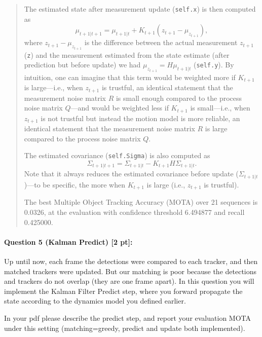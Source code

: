 \documentclass[11pt]{article}
\begin{document}
\begin{quote}
The estimated state after measurement update (\texttt{self.x}) is then computed as 
\[ \mu_{t+1 | t+1} = \mu_{t+1 | t} + K_{t+1} (z_{t+1} - \mu_{z_{t+1}}), \]
where $ z_{t+1} - \mu_{z_{t+1}} $ is the difference between the actual measurement $ z_{t+1} $ (\texttt{z}) and the measurement estimated from the state estimate (after prediction but before update) we had $ \mu_{z_{t+1}} = H \mu_{t+1 | t} $ (\texttt{self.y}). By intuition, one can imagine that this term would be weighted more if $ K_{t+1} $ is large---i.e., when $ z_{t+1} $ is trustful, an identical statement that the measurement noise matrix $ R $ is small enough compared to the process noise matrix $ Q $---and would be weighted less if $ K_{t+1} $ is small---i.e., when $ z_{t+1} $ is not trustful but instead the motion model is more reliable, an identical statement that the measurement noise matrix $ R $ is large compared to the process noise matrix $ Q $. 

The estimated covariance (\texttt{self.Sigma}) is also computed as 
\[ \Sigma_{t+1 | t+1} =  \Sigma_{t+1 | t} - K_{t+1} H \Sigma_{t+1 | t}. \]
Note that it always reduces the estimated covariance before update ($ \Sigma_{t+1 | t} $)---to be specific, the more when $ K_{t+1} $ is large (i.e., $ z_{t+1} $ is trustful).

The best Multiple Object Tracking Accuracy (MOTA) over 21 sequences is 0.0326, at the evaluation with confidence threshold 6.494877 and recall 0.425000. 

\end{quote}


\paragraph{Question 5 (Kalman Predict) [2 pt]:}
Up until now, each frame the detections were compared to each tracker, and then matched trackers were updated. But our matching is poor because the detections and trackers do not overlap (they are one frame apart). In this question you will implement the Kalman Filter Predict step, where you forward propagate the state according to the dynamics model you defined earlier.

In your pdf please describe the predict step, and report your evaluation MOTA under this setting (matching=greedy, predict and update both implemented).
\end{document}
